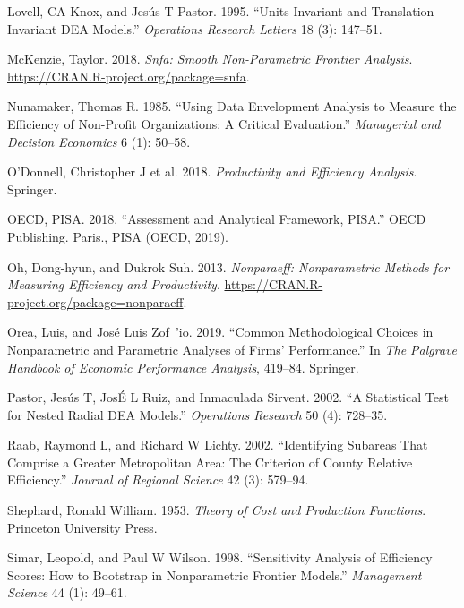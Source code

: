 \begin{CSLReferences}{1}{0}
\leavevmode{}%
Lovell, CA Knox, and Jesús T Pastor. 1995. {``Units Invariant and Translation Invariant DEA Models.''} \emph{Operations Research Letters} 18 (3): 147--51.

\leavevmode{}%
McKenzie, Taylor. 2018. \emph{Snfa: Smooth Non-Parametric Frontier Analysis}. \url{https://CRAN.R-project.org/package=snfa}.

\leavevmode{}%
Nunamaker, Thomas R. 1985. {``Using Data Envelopment Analysis to Measure the Efficiency of Non-Profit Organizations: A Critical Evaluation.''} \emph{Managerial and Decision Economics} 6 (1): 50--58.

\leavevmode{}%
O'Donnell, Christopher J et al. 2018. \emph{Productivity and Efficiency Analysis}. Springer.

\leavevmode{}%
OECD, PISA. 2018. {``Assessment and Analytical Framework, PISA.''} OECD Publishing. Paris., PISA (OECD, 2019).

\leavevmode{}%
Oh, Dong-hyun, and Dukrok Suh. 2013. \emph{Nonparaeff: Nonparametric Methods for Measuring Efficiency and Productivity}. \url{https://CRAN.R-project.org/package=nonparaeff}.

\leavevmode{}%
Orea, Luis, and José Luis Zof~'io. 2019. {``Common Methodological Choices in Nonparametric and Parametric Analyses of Firms' Performance.''} In \emph{The Palgrave Handbook of Economic Performance Analysis}, 419--84. Springer.

\leavevmode{}%
Pastor, Jesús T, JosÉ L Ruiz, and Inmaculada Sirvent. 2002. {``A Statistical Test for Nested Radial DEA Models.''} \emph{Operations Research} 50 (4): 728--35.

\leavevmode{}%
Raab, Raymond L, and Richard W Lichty. 2002. {``Identifying Subareas That Comprise a Greater Metropolitan Area: The Criterion of County Relative Efficiency.''} \emph{Journal of Regional Science} 42 (3): 579--94.

\leavevmode{}%
Shephard, Ronald William. 1953. \emph{Theory of Cost and Production Functions}. Princeton University Press.

\leavevmode{}%
Simar, Leopold, and Paul W Wilson. 1998. {``Sensitivity Analysis of Efficiency Scores: How to Bootstrap in Nonparametric Frontier Models.''} \emph{Management Science} 44 (1): 49--61.


\end{CSLReferences}
